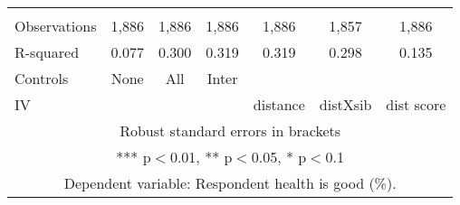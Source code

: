 \begin{tabular}{lcccccc}
 &  &  &  &  &  &  \\
Observations & 1,886 & 1,886 & 1,886 & 1,886 & 1,857 & 1,886 \\
R-squared & 0.077 & 0.300 & 0.319 & 0.319 & 0.298 & 0.135 \\
Controls & None & All & Inter &  &  &  \\
 IV &  &  &  & distance & distXsib & dist score \\ \hline
\multicolumn{7}{c}{ Robust standard errors in brackets} \\
\multicolumn{7}{c}{ *** p$<$0.01, ** p$<$0.05, * p$<$0.1} \\
\multicolumn{7}{c}{ Dependent variable: Respondent health is good (\%).} \\
\end{tabular}
